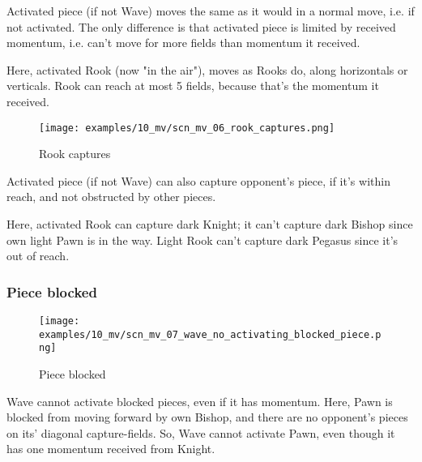 Activated piece (if not Wave) moves the same as it would in a normal move, i.e. if
not activated. The only difference is that activated piece is limited by received
momentum, i.e. can't move for more fields than momentum it received.

Here, activated Rook (now "in the air"), moves as Rooks do, along horizontals or
verticals. Rook can reach at most 5 fields, because that's the momentum it received.

\clearpage %

\vspace*{-2.1\baselineskip}
\noindent
\begin{figure}[!h]
\texttt{[image: examples/10\_mv/scn\_mv\_06\_rook\_captures.png]}
\caption{Rook captures}
\label{fig:scn_mv_06_rook_captures}
\end{figure}

Activated piece (if not Wave) can also capture opponent's piece, if it's within reach,
and not obstructed by other pieces.

Here, activated Rook can capture dark Knight; it can't capture dark Bishop since
own light Pawn is in the way. Light Rook can't capture dark Pegasus since it's out
of reach.

\clearpage %

\subsubsection*{Piece blocked}

\vspace*{-1.4\baselineskip}
\noindent
\begin{figure}[h]
\texttt{[image: examples/10\_mv/scn\_mv\_07\_wave\_no\_activating\_blocked\_piece.png]}
\caption{Piece blocked}
\label{fig:scn_mv_07_wave_no_activating_blocked_piece}
\end{figure}

Wave cannot activate blocked pieces, even if it has momentum. Here, Pawn is blocked
from moving forward by own Bishop, and there are no opponent's pieces on its'
diagonal capture-fields. So, Wave cannot activate Pawn, even though it has one
momentum received from Knight.

\clearpage %


